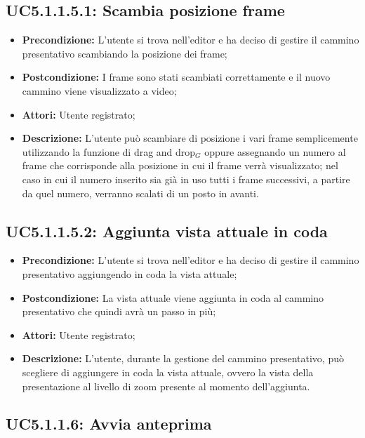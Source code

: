 \subsection{ UC5.1.1.5.1: Scambia posizione frame}

\begin{itemize}
	\item \textbf{Precondizione:} L’utente si trova nell’editor e ha deciso di gestire il cammino presentativo scambiando la posizione dei frame;
	\item \textbf{Postcondizione:} I frame sono stati scambiati correttamente e il nuovo cammino viene visualizzato a video;
	\item \textbf{Attori:} Utente registrato;
	\item \textbf{Descrizione:} L’utente può scambiare di posizione i vari frame semplicemente utilizzando la funzione di drag and drop$_G$ oppure assegnando un numero al frame che corrisponde alla posizione in cui il frame verrà visualizzato; nel caso in cui il numero inserito sia già in uso tutti i frame successivi, a partire da quel numero, verranno scalati di un posto in avanti.
\end{itemize}
\subsection{ UC5.1.1.5.2: Aggiunta vista attuale in coda}

\begin{itemize}
	\item \textbf{Precondizione:} L’utente si trova nell’editor e ha deciso di gestire il cammino presentativo aggiungendo in coda la vista attuale;
	\item \textbf{Postcondizione:} La vista attuale viene aggiunta in coda al cammino presentativo che quindi avrà un passo in più;
	\item \textbf{Attori:} Utente registrato;
	\item \textbf{Descrizione:} L’utente, durante la gestione del cammino presentativo, può scegliere di aggiungere in coda la vista attuale, ovvero la vista della presentazione al livello di zoom presente al momento dell’aggiunta.
\end{itemize}
\subsection{ UC5.1.1.6: Avvia anteprima}

